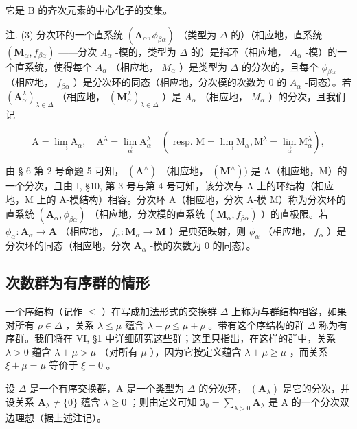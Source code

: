 它是 B 的齐次元素的中心化子的交集。

注. (3) 分次环的一个直系统 \((\mathbf{A}_{\alpha}, \phi_{\beta\alpha})\) （类型为 \(\Delta\) 的）（相应地，直系统 \((\mathbf{M}_{\alpha}, f_{\beta\alpha})\) ——分次 \(A_{\alpha}\) -模的，类型为 \(\Delta\) 的）是指环（相应地， \(A_{\alpha}\) -模）的一个直系统，使得每个 \(A_{\alpha}\) （相应地， \(M_{\alpha}\) ）是类型为 \(\Delta\) 的分次的，且每个 \(\phi_{\beta\alpha}\) （相应地， \(f_{\beta\alpha}\) ）是分次环的同态（相应地，分次模的次数为 0 的 \(A_{\alpha}\) -同态）。若 \((\mathbf{A}_{\alpha}^{\lambda})_{\lambda \in \Delta}\) （相应地， \((\mathbf{M}_{\alpha}^{\lambda})_{\lambda \in \Delta}\) ）是 \(A_{\alpha}\) （相应地， \(M_{\alpha}\) ）的分次，且我们记

\[
\mathrm{A} = \lim _ {\rightarrow} \mathrm{A} _ {\alpha}, \quad \mathrm{A} ^ {\lambda} = \lim _ {\overrightarrow {\alpha}} \mathrm{A} _ {\alpha} ^ {\lambda} \quad (\text { resp.   } \mathrm{M} = \lim _ {\rightarrow} \mathrm{M} _ {\alpha}, \mathrm{M} ^ {\lambda} = \lim _ {\overrightarrow {\alpha}} \mathrm{M} _ {\alpha} ^ {\lambda}),
\]

由 § 6 第 2 号命题 5 可知， \((\mathbf{A}^{\wedge})\) （相应地， \((\mathbf{M}^{\wedge}))\) 是 A（相应地，M）的一个分次，且由 I, §10, 第 3 号与第 4 号可知，该分次与 A 上的环结构（相应地，M 上的 A-模结构）相容。分次环 A（相应地，分次 A-模 M）称为分次环的直系统 \((\mathbf{A}_{\alpha}, \phi_{\beta \alpha})\) （相应地，分次模的直系统 \((\mathbf{M}_{\alpha}, f_{\beta \alpha})\) ）的直极限。若 \(\phi_{\alpha} \colon \mathbf{A}_{\alpha} \to \mathbf{A}\) （相应地， \(f_{\alpha} \colon \mathbf{M}_{\alpha} \to \mathbf{M}\) ）是典范映射，则 \(\phi_{\alpha}\) （相应地， \(f_{\alpha}\) ）是分次环的同态（相应地，分次 \(\mathbf{A}_{\alpha}\) -模的次数为 0 的同态）。

\subsection{次数群为有序群的情形}

一个序结构（记作 \(\leqslant\) ）在写成加法形式的交换群 \(\Delta\) 上称为与群结构相容，如果对所有 \(\rho\in\Delta\) ，关系 \(\lambda\leqslant\mu\) 蕴含 \(\lambda+\rho\leqslant\mu+\rho\) 。带有这个序结构的群 \(\Delta\) 称为有序群。我们将在 VI, §1 中详细研究这些群；这里只指出，在这样的群中，关系 \(\lambda>0\) 蕴含 \(\lambda+\mu>\mu\) （对所有 \(\mu\) ），因为它按定义蕴含 \(\lambda+\mu\geqslant\mu\) ，而关系 \(\xi+\mu=\mu\) 等价于 \(\xi=0\) 。

设 \(\Delta\) 是一个有序交换群，A 是一个类型为 \(\Delta\) 的分次环， \((\mathbf{A}_{\lambda})\) 是它的分次，并设关系 \(\mathbf{A}_{\lambda} \neq \{0\}\) 蕴含 \(\lambda \geqslant 0\) ；则由定义可知 \(\mathfrak{I}_0 = \sum_{\lambda > 0} \mathbf{A}_{\lambda}\) 是 A 的一个分次双边理想（据上述注记）。

